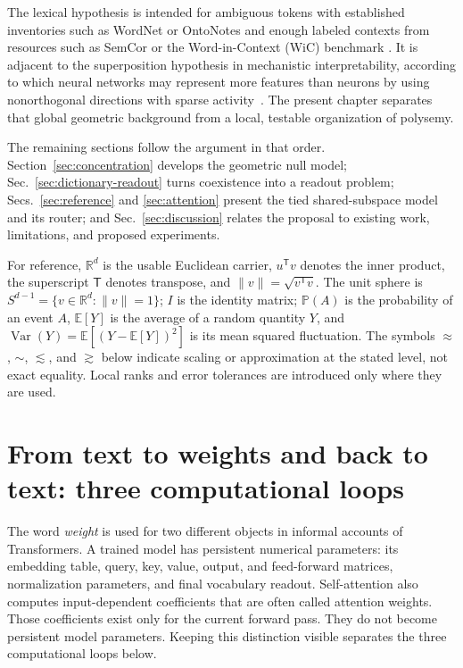 \documentclass[
  aps,
  reprint,
  superscriptaddress,
  floatfix,
  nofootinbib,
  longbibliography
]{revtex4-2}
\newcommand{\R}{\mathbb{R}}
\newcommand{\E}{\mathbb{E}}
\newcommand{\Prob}{\mathbb{P}}
\newcommand{\Sph}[1]{S^{#1}}
\newcommand{\T}{^{\mathsf{T}}}
\newcommand{\norm}[1]{\lVert #1 \rVert}
\DeclareMathOperator{\Var}{Var}
\begin{document}
The lexical hypothesis is intended for ambiguous tokens with established
inventories such as WordNet or OntoNotes and enough labeled contexts from
resources such as SemCor or the Word-in-Context (WiC) benchmark
\cite{pilehvar2019wic}.  It is adjacent to the superposition hypothesis in
mechanistic interpretability, according to which neural networks may represent
more features than neurons by using nonorthogonal directions with sparse
activity~\cite{elhage2022superposition}.  The present chapter separates that
global geometric background from a local, testable organization of polysemy.

The remaining sections follow the argument in that order.
Section~\ref{sec:concentration} develops the geometric null model;
Sec.~\ref{sec:dictionary-readout} turns coexistence into a readout problem;
Secs.~\ref{sec:reference} and \ref{sec:attention} present the tied
shared-subspace model and its router; and Sec.~\ref{sec:discussion} relates the
proposal to existing work, limitations, and proposed experiments.

For reference, $\R^d$ is the usable Euclidean carrier, $u\T v$ denotes the
inner product, the superscript $\mathsf T$ denotes transpose, and
$\norm{v}=\sqrt{v\T v}$.  The unit sphere is
$\Sph{d-1}=\{v\in\R^d:\norm v=1\}$; $I$ is the identity matrix;
$\Prob(A)$ is the probability of an event $A$, $\E[Y]$ is the average of a
random quantity $Y$, and
$\Var(Y)=\E[(Y-\E[Y])^2]$ is its mean squared fluctuation.  The
symbols $\approx$, $\sim$, $\lesssim$, and $\gtrsim$ below indicate scaling or
approximation at the stated level, not exact equality.  Local ranks and error
tolerances are introduced only where they are used.

\section{From text to weights and back to text: three computational loops}
\label{sec:llm-loops}

The word \emph{weight} is used for two different objects in informal accounts
of Transformers.  A trained model has persistent numerical parameters: its
embedding table, query, key, value, output, and feed-forward matrices,
normalization parameters, and final vocabulary readout.  Self-attention also
computes input-dependent coefficients that are often called attention
weights.  Those coefficients exist only for the current forward pass.  They
do not become persistent model parameters.  Keeping this distinction visible
separates the three computational loops below.
\end{document}
